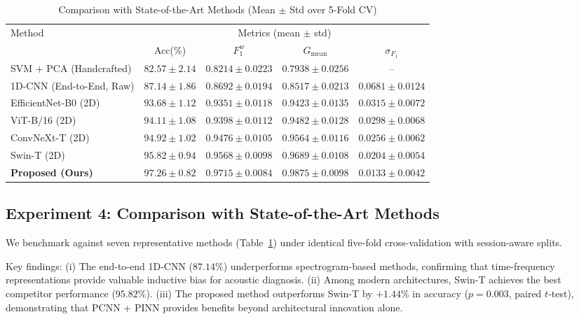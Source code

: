 \documentclass[twocolumn,iicol,pdflatex,sn-mathphys-num]{sn-jnl}%
\begin{document}
\begin{table}
	\begin{minipage}{\textheight}
	\centering
	\caption{Comparison with State-of-the-Art Methods (Mean $\pm$ Std over 5-Fold CV)}
	\label{tab7}
	\begin{tabular*}{\textheight}{@{\extracolsep\fill}l c c c c}
		\toprule
		\multirow{2}{*}{Method} & \multicolumn{4}{c}{Metrics (mean $\pm$ std)} \\
		\cmidrule(lr){2-5}
		& Acc(\%) & $F_1^w$ & $G_{\text{mean}}$ & $\sigma_{F_1}$ \\
		\midrule
		SVM + PCA (Handcrafted)      & $82.57 \pm 2.14$ & $0.8214 \pm 0.0223$ & $0.7938 \pm 0.0256$ & -- \\
		1D-CNN (End-to-End, Raw)    & $87.14 \pm 1.86$ & $0.8692 \pm 0.0194$ & $0.8517 \pm 0.0213$ & $0.0681 \pm 0.0124$ \\
		EfficientNet-B0 (2D)        & $93.68 \pm 1.12$ & $0.9351 \pm 0.0118$ & $0.9423 \pm 0.0135$ & $0.0315 \pm 0.0072$ \\
		ViT-B/16 (2D)               & $94.11 \pm 1.08$ & $0.9398 \pm 0.0112$ & $0.9482 \pm 0.0128$ & $0.0298 \pm 0.0068$ \\
		ConvNeXt-T (2D)             & $94.92 \pm 1.02$ & $0.9476 \pm 0.0105$ & $0.9564 \pm 0.0116$ & $0.0256 \pm 0.0062$ \\
		Swin-T (2D)                 & $95.82 \pm 0.94$ & $0.9568 \pm 0.0098$ & $0.9689 \pm 0.0108$ & $0.0204 \pm 0.0054$ \\
		\textbf{Proposed (Ours)}    & $\bm{97.26 \pm 0.82}$ & $\bm{0.9715 \pm 0.0084}$ & $\bm{0.9875 \pm 0.0098}$ & $\bm{0.0133 \pm 0.0042}$ \\
		\bottomrule
	\end{tabular*}
	\end{minipage}
\end{table}

\subsection{Experiment 4: Comparison with State-of-the-Art Methods}
We benchmark against seven representative methods (Table~\ref{tab7}) under identical five-fold cross-validation with session-aware splits.

Key findings: (i) The end-to-end 1D-CNN ($87.14\%$) underperforms spectrogram-based methods, confirming that time-frequency representations provide valuable inductive bias for acoustic diagnosis. (ii) Among modern architectures, Swin-T achieves the best competitor performance ($95.82\%$). (iii) The proposed method outperforms Swin-T by $+1.44\%$ in accuracy ($p = 0.003$, paired $t$-test), demonstrating that PCNN + PINN provides benefits beyond architectural innovation alone.
\end{document}
